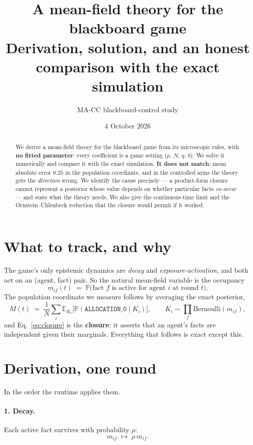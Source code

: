 \documentclass[11pt,a4paper]{article}
\title{\textbf{A mean-field theory for the blackboard game}\\[2mm]
\large Derivation, solution, and an honest comparison with the exact simulation}
\author{MA-CC blackboard-control study}\date{4 October 2026}
\newcommand{\Prob}{\mathbb{P}}\newcommand{\Ex}{\mathbb{E}}
\newcommand{\A}[1]{\texttt{ALLOCATION\_#1}}
\begin{document}
\maketitle

\begin{abstract}\noindent
We derive a mean-field theory for the blackboard game from its microscopic
rules, with \textbf{no fitted parameter}: every coefficient is a game setting
($\rho$, $N$, $q$, $b$). We solve it numerically and compare it with the exact
simulation. \textbf{It does not match}: mean absolute error $0.25$ in the
population coordinate, and in the controlled arms the theory gets the
\emph{direction} wrong. We identify the cause precisely --- a product-form
closure cannot represent a posterior whose value depends on whether particular
facts \emph{co-occur} --- and state what the theory needs. We also give the
continuous-time limit and the Ornstein--Uhlenbeck reduction that the closure
would permit if it worked.
\end{abstract}

\section{What to track, and why}

The game's only epistemic dynamics are \emph{decay} and
\emph{exposure-activation}, and both act on an (agent, fact) pair. So the
natural mean-field variable is the occupancy
\[
m_{if}(t) \;=\; \Prob\big(\text{fact } f \text{ is active for agent } i \text{ at round } t\big).
\]
The population coordinate we measure follows by averaging the exact posterior,
\begin{equation}
M(t) \;=\; \frac1N\sum_i \Ex_{K_i}\big[\Prob(\A{0}\mid K_i)\big],
\qquad K_i \sim \textstyle\prod_f \mathrm{Bernoulli}(m_{if}),
\label{eq:closure}
\end{equation}
and Eq.~\eqref{eq:closure} is the \textbf{closure}: it asserts that an agent's
facts are independent given their marginals. Everything that follows is exact
except this.

\section{Derivation, one round}

In the order the runtime applies them.

\paragraph{1. Decay.} Each active fact survives with probability $\rho$:
\begin{equation}
m_{if} \;\longmapsto\; \rho\, m_{if}.
\end{equation}
\end{document}
